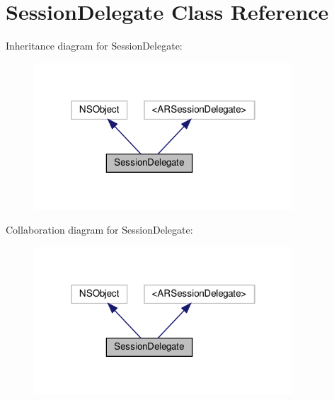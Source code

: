 \hypertarget{interfaceSessionDelegate}{}\section{Session\+Delegate Class Reference}
\label{interfaceSessionDelegate}


Inheritance diagram for Session\+Delegate\+:\nopagebreak
\begin{figure}[H]
\begin{center}
\leavevmode
\includegraphics[width=274pt]{interfaceSessionDelegate__inherit__graph}
\end{center}
\end{figure}


Collaboration diagram for Session\+Delegate\+:\nopagebreak
\begin{figure}[H]
\begin{center}
\leavevmode
\includegraphics[width=274pt]{interfaceSessionDelegate__coll__graph}
\end{center}
\end{figure}
